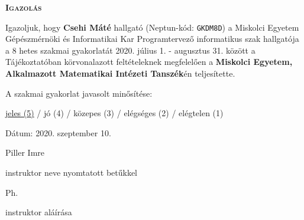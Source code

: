 \documentclass[a4paper, 14pt]{extarticle}
\begin{document}

\pagestyle{empty}

\begin{center}
\textbf{\textsc{Igazolás}}
\end{center}

\vskip 1cm

\noindent Igazoljuk, hogy \textbf{Csehi Máté} hallgató (Neptun-kód: \texttt{GKDM8D})
a Miskolci Egyetem Gépészmérnöki és Informatikai Kar Programtervező informatikus szak hallgatója a 8 hetes szakmai gyakorlatát
2020. július 1. - augusztus 31. között a Tájékoztatóban körvonalazott feltételeknek megfelelően a \textbf{Miskolci Egyetem, Alkalmazott Matematikai Intézeti Tanszék}én teljesítette.

\vskip 1cm

\noindent A szakmai gyakorlat javasolt minősítése:

\noindent \underline{jeles (5)} / jó (4) / közepes (3) / elégséges (2) / elégtelen (1)

\vskip 2cm

\noindent Dátum: 2020. szeptember 10.

\vskip 1cm

\hskip 10cm Piller Imre

\hskip 7cm instruktor neve nyomtatott betűkkel

\vskip 1cm

\hskip 2cm Ph.

\vskip 1cm

\hskip 9cm instruktor aláírása
\end{document}
